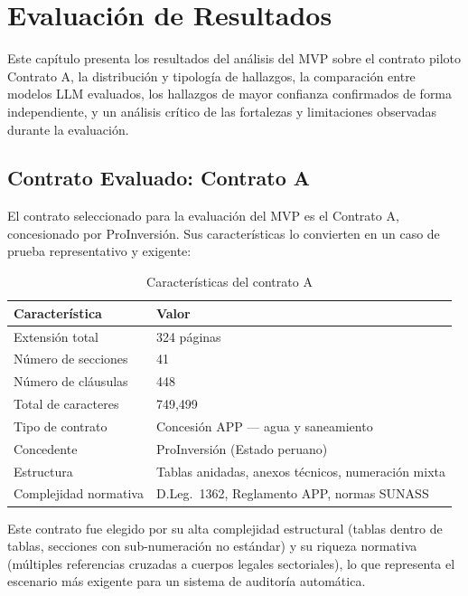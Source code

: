 \chapter{Evaluación de Resultados}

Este capítulo presenta los resultados del análisis del MVP sobre el contrato
piloto Contrato A, la distribución y tipología de hallazgos, la
comparación entre modelos LLM evaluados, los hallazgos de mayor confianza
confirmados de forma independiente, y un análisis crítico de las fortalezas
y limitaciones observadas durante la evaluación.

\section*{Contrato Evaluado: Contrato A}

El contrato seleccionado para la evaluación del MVP es el Contrato A, concesionado por
ProInversión. Sus características lo convierten en un caso de prueba
representativo y exigente:

\begin{table}[H]
\centering
\caption{Características del contrato A}
\label{tab:contrato_ptar}
\begin{tabular}{p{4.5cm} p{8.5cm}}
\toprule
\textbf{Característica} & \textbf{Valor} \\
\midrule
Extensión total           & 324 páginas \\
Número de secciones       & 41 \\
Número de cláusulas       & 448 \\
Total de caracteres       & 749{,}499 \\
Tipo de contrato          & Concesión APP — agua y saneamiento \\
Concedente                & ProInversión (Estado peruano) \\
Estructura                & Tablas anidadas, anexos técnicos, numeración mixta \\
Complejidad normativa     & D.Leg.\ 1362, Reglamento APP, normas SUNASS \\
\bottomrule
\end{tabular}
\end{table}

Este contrato fue elegido por su alta complejidad estructural (tablas
dentro de tablas, secciones con sub-numeración no estándar) y su riqueza
normativa (múltiples referencias cruzadas a cuerpos legales sectoriales),
lo que representa el escenario más exigente para un sistema de auditoría
automática.

